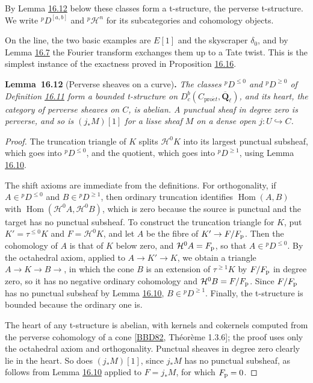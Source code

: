 \documentclass[11pt]{article}
\newenvironment{bpstatement}[2]{\par\addvspace{0.6\baselineskip}\noindent\textbf{#1}#2\textbf{.}\enspace\ignorespaces}
  {\par\addvspace{0.4\baselineskip}}
\newenvironment{bpstatementit}[2]{\begin{bpstatement}{#1}{#2}\itshape\ignorespaces}{\end{bpstatement}}
\providecommand{\Hom}{}\renewcommand{\Hom}{\operatorname{Hom}}
\begin{document}
\label{bp36}%
By Lemma \hyperref[bp37]{16.12} below these classes form a t-structure, the perverse t-structure. We write \({}^pD^{[a,b]}\) and \({}^p\mathcal H^n\) for its subcategories and cohomology objects.

On the line, the two basic examples are \(E[1]\) and the skyscraper \(\delta_0\), and by Lemma \hyperref[bp22]{16.7} the Fourier transform exchanges them up to a Tate twist. This is the simplest instance of the exactness proved in Proposition \hyperref[bp48]{16.16}.

\label{bp37}%
\begin{bpstatementit}{Lemma~16.12}{ (Perverse sheaves on a curve)}
The classes \({}^pD^{\le0}\) and \({}^pD^{\ge0}\) of Definition \hyperref[bp35]{16.11} form a bounded t-structure on \(D^b_c(C_{\mathrm{pro}\acute{e}t},\overline{\mathbf Q}_\ell)\), and its heart, the category of perverse sheaves on \(C\), is abelian. A punctual sheaf in degree zero is perverse, and so is \((j_*M)[1]\) for a lisse sheaf \(M\) on a dense open \(j:U\hookrightarrow C\).
\end{bpstatementit}

\begin{proof}[{Proof}]\label{bp38}%
The truncation triangle of \(K\) splits \(\mathcal H^0K\) into its largest punctual subsheaf, which goes into \({}^pD^{\le0}\), and the quotient, which goes into \({}^pD^{\ge1}\), using Lemma \hyperref[bp33]{16.10}.

The shift axioms are immediate from the definitions. For orthogonality, if \(A\in{}^pD^{\le0}\) and \(B\in{}^pD^{\ge1}\), then ordinary truncation identifies \(\Hom(A,B)\) with \(\Hom(\mathcal H^0A,\mathcal H^0B)\), which is zero because the source is punctual and the target has no punctual subsheaf. To construct the truncation triangle for \(K\), put \(K'=\tau^{\le0}K\) and \(F=\mathcal H^0K\), and let \(A\) be the fibre of \(K'\to F/F_{\rm p}\). Then the cohomology of \(A\) is that of \(K\) below zero, and \(\mathcal H^0A=F_{\rm p}\), so that \(A\in{}^pD^{\le0}\). By the octahedral axiom, applied to \(A\to K'\to K\), we obtain a triangle \(A\to K\to B\to\), in which the cone \(B\) is an extension of \(\tau^{\ge1}K\) by \(F/F_{\rm p}\) in degree zero, so it has no negative ordinary cohomology and \(\mathcal H^0B=F/F_{\rm p}\). Since \(F/F_{\rm p}\) has no punctual subsheaf by Lemma \hyperref[bp33]{16.10}, \(B\in{}^pD^{\ge1}\). Finally, the t-structure is bounded because the ordinary one is.

The heart of any t-structure is abelian, with kernels and cokernels computed from the perverse cohomology of a cone [\hyperref[bp58]{BBD82}, Théorème 1.3.6]; the proof uses only the octahedral axiom and orthogonality. Punctual sheaves in degree zero clearly lie in the heart. So does \((j_*M)[1]\), since \(j_*M\) has no punctual subsheaf, as follows from Lemma \hyperref[bp33]{16.10} applied to \(F=j_*M\), for which \(F_{\rm p}=0\).
\end{proof}
\end{document}
